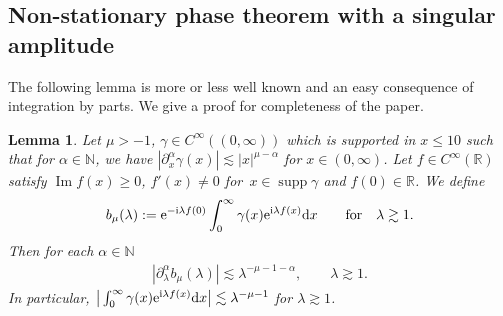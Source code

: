 \documentclass[11pt]{article}
\numberwithin{equation}{section}
\newtheorem{Lemma}[Theorem]{Lemma}
\def\R{\mathbb{R}}%
\DeclareMathOperator{\supp}{supp}%
\DeclareMathOperator{\im}{Im}%
\def\a{\alpha}
\def\c{\gamma}
\def\l{\lambda}
\def\m{\mu}
\def\pa{\partial}
\begin{document}
\subsection{Non-stationary phase theorem with a singular amplitude}

The following lemma is more or less well known and an easy consequence of integration by parts. We give a proof for completeness of the paper.

\begin{Lemma}\label{singularasym}
Let $\m>-1$, $\c\in C^{\infty}((0,\infty))$ which is supported in $x\leq 10$ such that for $\a\in\mathbb{N}$, we have $|\pa_x^{\a}\c(x)|\lesssim |x|^{\m-\a}$ for $x\in (0,\infty)$. Let $f\in C^{\infty}(\R)$ satisfy $\im f(x)\geq 0$, $f'(x)\neq 0$ for~${x\in \supp \c}$ and $f(0)\in \R$. We define
\begin{align*}
b_{\m}(\l):={\rm e}^{-{\rm i}\l f(0)}\int_{0}^{\infty}\c(x){\rm e}^{{\rm i}\l f(x)}{\rm d}x\qquad \text{for}\quad \l\gtrsim 1.
\end{align*}
Then for each $\a\in\mathbb{N}$
\begin{align}\label{singbmues}
|\partial_{\l}^{\a}b_{\m}(\l)|\lesssim \l^{-\m-1-\a},\qquad \l\gtrsim 1.
\end{align}
In particular, $\big|\int_{0}^{\infty}\c(x){\rm e}^{{\rm i}\l f(x)}{\rm d}x\big|\lesssim \l^{-\m-1}$ for $\l\gtrsim 1$.
\end{Lemma}
\end{document}
